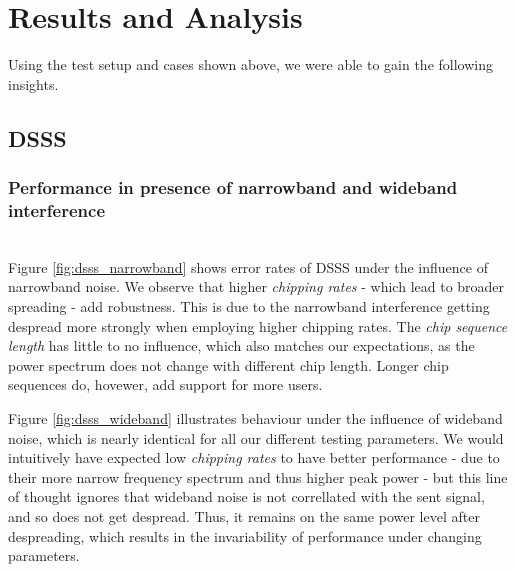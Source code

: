 \section{Results and Analysis}
	Using the test setup and cases shown above, we were able to gain the following insights.
	\subsection{DSSS}
		\subsubsection{Performance in presence of narrowband and wideband interference}~\\
			Figure \ref{fig:dsss_narrowband} shows error rates of DSSS under the influence of narrowband noise. We observe that higher \emph{chipping rates} - which lead to broader spreading - add robustness.
			This is due to the narrowband interference getting despread more strongly when employing higher chipping rates.
			The \emph{chip sequence length} has little to no influence, which also matches our expectations, as the power spectrum does not change with different chip length. Longer chip sequences do, hovewer, add support for more users.
			
			Figure \ref{fig:dsss_wideband} illustrates behaviour under the influence of wideband noise, which is nearly identical for all our different testing parameters.
			We would intuitively have expected low \emph{chipping rates} to have better performance - due to their more narrow frequency spectrum and thus higher peak power - but this line of thought ignores that wideband noise is not correllated with the sent signal, and so does not get despread. Thus, it remains on the same power level after despreading, which results in the invariability of performance under changing parameters.
			
